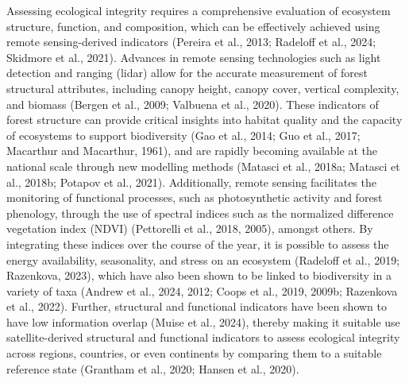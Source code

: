 \documentclass[
]{agujournal2019}
\begin{document}
Assessing ecological integrity requires a comprehensive evaluation of
ecosystem structure, function, and composition, which can be effectively
achieved using remote sensing-derived indicators (Pereira et al., 2013;
Radeloff et al., 2024; Skidmore et al., 2021). Advances in remote
sensing technologies such as light detection and ranging (lidar) allow
for the accurate measurement of forest structural attributes, including
canopy height, canopy cover, vertical complexity, and biomass (Bergen et
al., 2009; Valbuena et al., 2020). These indicators of forest structure
can provide critical insights into habitat quality and the capacity of
ecosystems to support biodiversity (Gao et al., 2014; Guo et al., 2017;
Macarthur and Macarthur, 1961), and are rapidly becoming available at
the national scale through new modelling methods (Matasci et al., 2018a;
Matasci et al., 2018b; Potapov et al., 2021). Additionally, remote
sensing facilitates the monitoring of functional processes, such as
photosynthetic activity and forest phenology, through the use of
spectral indices such as the normalized difference vegetation index
(NDVI) (Pettorelli et al., 2018, 2005), amongst others. By integrating
these indices over the course of the year, it is possible to assess the
energy availability, seasonality, and stress on an ecosystem (Radeloff
et al., 2019; Razenkova, 2023), which have also been shown to be linked
to biodiversity in a variety of taxa (Andrew et al., 2024, 2012; Coops
et al., 2019, 2009b; Razenkova et al., 2022). Further, structural and
functional indicators have been shown to have low information overlap
(Muise et al., 2024), thereby making it suitable use satellite-derived
structural and functional indicators to assess ecological integrity
across regions, countries, or even continents by comparing them to a
suitable reference state (Grantham et al., 2020; Hansen et al., 2020).
\end{document}
